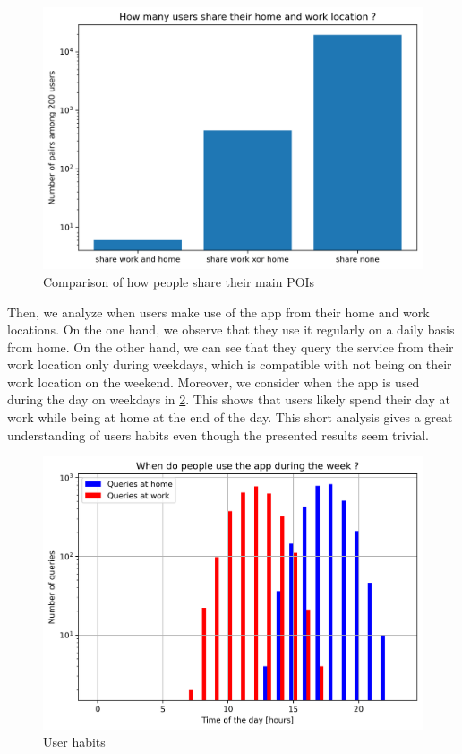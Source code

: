 \documentclass[10pt,conference,compsocconf]{IEEEtran}
\begin{document}
\begin{figure}
  \includegraphics[width=\columnwidth]{share.png}
  \caption{Comparison of how people share their main POIs}
  \label{share_fig}
\end{figure}

Then, we analyze when users make use of the app from their home and work locations. On the one hand, we observe that they use it regularly on a daily basis from home. On the other hand, we can see that they query the service from their work location only during weekdays, which is compatible with not being on their work location on the weekend. Moreover, we consider when the app is used during the day on weekdays in \ref{when_fig}. This shows that users likely spend their day at work while being at home at the end of the day. This short analysis gives a great understanding of users habits even though the presented results seem trivial.

\begin{figure}
  \includegraphics[width=\columnwidth]{when.png}
  \caption{User habits}
  \label{when_fig}
\end{figure}
\end{document}
